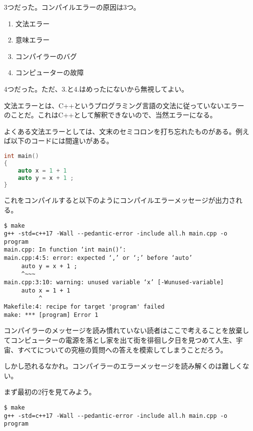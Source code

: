 3つだった。コンパイルエラーの原因は3つ。

\begin{enumerate}
\def\labelenumi{\arabic{enumi}.}
\item
  文法エラー
\item
  意味エラー
\item
  コンパイラーのバグ
\item
  コンピューターの故障
\end{enumerate}

4つだった。ただ、3.と4.はめったにないから無視してよい。


文法エラーとは、C++というプログラミング言語の文法に従っていないエラーのことだ。これはC++として解釈できないので、当然エラーになる。

よくある文法エラーとしては、文末のセミコロンを打ち忘れたものがある。例えば以下のコードには間違いがある。

\begin{lstlisting}[language=c++]
int main()
{
    auto x = 1 + 1 
    auto y = x + 1 ;
}
\end{lstlisting}

これをコンパイルすると以下のようにコンパイルエラーメッセージが出力される。

\begin{lstlisting}[style=terminal]
$ make
g++ -std=c++17 -Wall --pedantic-error -include all.h main.cpp -o program
main.cpp: In function ‘int main()’:
main.cpp:4:5: error: expected ‘,’ or ‘;’ before ‘auto’
     auto y = x + 1 ;
     ^~~~
main.cpp:3:10: warning: unused variable ‘x’ [-Wunused-variable]
     auto x = 1 + 1
          ^
Makefile:4: recipe for target 'program' failed
make: *** [program] Error 1
\end{lstlisting}

コンパイラーのメッセージを読み慣れていない読者はここで考えることを放棄してコンピューターの電源を落とし家を出て街を徘徊し夕日を見つめて人生、宇宙、すべてについての究極の質問への答えを模索してしまうことだろう。

しかし恐れるなかれ。コンパイラーのエラーメッセージを読み解くのは難しくない。

まず最初の2行を見てみよう。

\begin{lstlisting}[style=terminal]
$ make
g++ -std=c++17 -Wall --pedantic-error -include all.h main.cpp -o program
\end{lstlisting}

